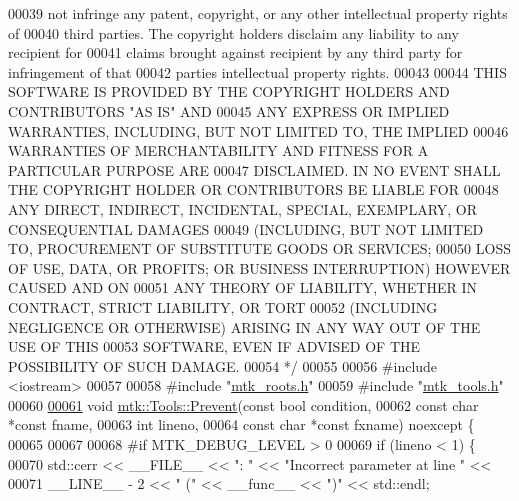 \begin{DoxyCode}
00039 \textcolor{comment}{not infringe any patent, copyright, or any other intellectual property rights of}
00040 \textcolor{comment}{third parties. The copyright holders disclaim any liability to any recipient for}
00041 \textcolor{comment}{claims brought against recipient by any third party for infringement of that}
00042 \textcolor{comment}{parties intellectual property rights.}
00043 \textcolor{comment}{}
00044 \textcolor{comment}{THIS SOFTWARE IS PROVIDED BY THE COPYRIGHT HOLDERS AND CONTRIBUTORS "AS IS" AND}
00045 \textcolor{comment}{ANY EXPRESS OR IMPLIED WARRANTIES, INCLUDING, BUT NOT LIMITED TO, THE IMPLIED}
00046 \textcolor{comment}{WARRANTIES OF MERCHANTABILITY AND FITNESS FOR A PARTICULAR PURPOSE ARE}
00047 \textcolor{comment}{DISCLAIMED. IN NO EVENT SHALL THE COPYRIGHT HOLDER OR CONTRIBUTORS BE LIABLE FOR}
00048 \textcolor{comment}{ANY DIRECT, INDIRECT, INCIDENTAL, SPECIAL, EXEMPLARY, OR CONSEQUENTIAL DAMAGES}
00049 \textcolor{comment}{(INCLUDING, BUT NOT LIMITED TO, PROCUREMENT OF SUBSTITUTE GOODS OR SERVICES;}
00050 \textcolor{comment}{LOSS OF USE, DATA, OR PROFITS; OR BUSINESS INTERRUPTION) HOWEVER CAUSED AND ON}
00051 \textcolor{comment}{ANY THEORY OF LIABILITY, WHETHER IN CONTRACT, STRICT LIABILITY, OR TORT}
00052 \textcolor{comment}{(INCLUDING NEGLIGENCE OR OTHERWISE) ARISING IN ANY WAY OUT OF THE USE OF THIS}
00053 \textcolor{comment}{SOFTWARE, EVEN IF ADVISED OF THE POSSIBILITY OF SUCH DAMAGE.}
00054 \textcolor{comment}{*/}
00055 
00056 \textcolor{preprocessor}{#include <iostream>}
00057 
00058 \textcolor{preprocessor}{#include "\hyperlink{mtk__roots_8h}{mtk\_roots.h}"}
00059 \textcolor{preprocessor}{#include "\hyperlink{mtk__tools_8h}{mtk\_tools.h}"}
00060 
\hypertarget{mtk__tools_8cc_source_l00061}{}\hyperlink{classmtk_1_1Tools_a332324c6f25e66be9dff48c5987a3b9f}{00061} \textcolor{keywordtype}{void} \hyperlink{classmtk_1_1Tools_a332324c6f25e66be9dff48c5987a3b9f}{mtk::Tools::Prevent}(\textcolor{keyword}{const} \textcolor{keywordtype}{bool} condition,
00062                          \textcolor{keyword}{const} \textcolor{keywordtype}{char} *\textcolor{keyword}{const} fname,
00063                          \textcolor{keywordtype}{int} lineno,
00064                          \textcolor{keyword}{const} \textcolor{keywordtype}{char} *\textcolor{keyword}{const} fxname) noexcept \{
00065 
00067 
00068 \textcolor{preprocessor}{  #if MTK\_DEBUG\_LEVEL > 0}
00069   \textcolor{keywordflow}{if} (lineno < 1) \{
00070     std::cerr << \_\_FILE\_\_ << \textcolor{stringliteral}{": "} << \textcolor{stringliteral}{"Incorrect parameter at line "} <<
00071     \_\_LINE\_\_ - 2 << \textcolor{stringliteral}{" ("} << \_\_func\_\_ << \textcolor{stringliteral}{")"} << std::endl;

\end{DoxyCode}
